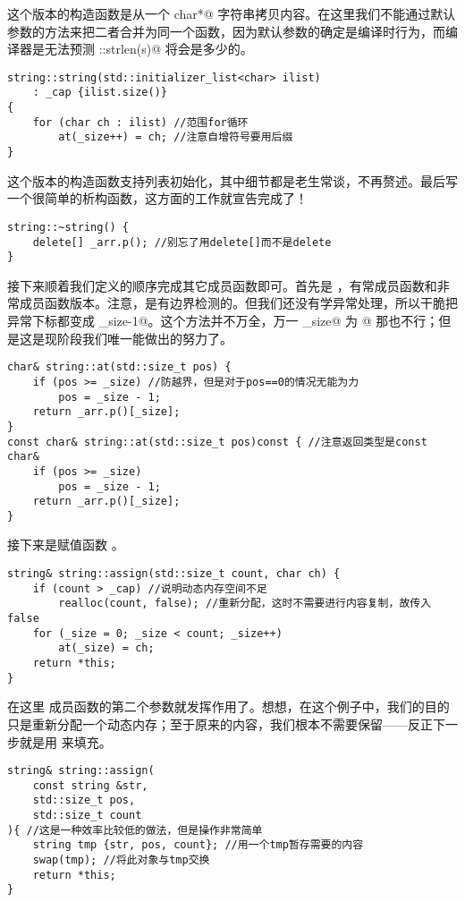 这个版本的构造函数是从一个 \lstinline@const char*@ 字符串拷贝内容。在这里我们不能通过默认参数的方法来把二者合并为同一个函数，因为默认参数的确定是编译时行为，而编译器是无法预测 \lstinline@std::strlen(s)@ 将会是多少的。
\begin{lstlisting}
string::string(std::initializer_list<char> ilist)
    : _cap {ilist.size()}
{
    for (char ch : ilist) //范围for循环
        at(_size++) = ch; //注意自增符号要用后缀
}
\end{lstlisting}
这个版本的构造函数支持列表初始化，其中细节都是老生常谈，不再赘述。最后写一个很简单的析构函数，这方面的工作就宣告完成了！
\begin{lstlisting}
string::~string() {
    delete[] _arr.p(); //别忘了用delete[]而不是delete
}
\end{lstlisting}\par
接下来顺着我们定义的顺序完成其它成员函数即可。首先是 \lstinline@at@，有常成员函数和非常成员函数版本。注意，\lstinline@at@ 是有边界检测的。但我们还没有学异常处理，所以干脆把异常下标都变成 \lstinline@_size-1@。这个方法并不万全，万一 \lstinline@_size@ 为 @ 那也不行；但是这是现阶段我们唯一能做出的努力了。\par
\begin{lstlisting}
char& string::at(std::size_t pos) {
    if (pos >= _size) //防越界，但是对于pos==0的情况无能为力
        pos = _size - 1;
    return _arr.p()[_size];
}
const char& string::at(std::size_t pos)const { //注意返回类型是const char&
    if (pos >= _size)
        pos = _size - 1;
    return _arr.p()[_size];
}
\end{lstlisting}\par
接下来是赋值函数 \lstinline@assign@。
\begin{lstlisting}
string& string::assign(std::size_t count, char ch) {
    if (count > _cap) //说明动态内存空间不足
        realloc(count, false); //重新分配，这时不需要进行内容复制，故传入false
    for (_size = 0; _size < count; _size++)
        at(_size) = ch;
    return *this;
}
\end{lstlisting}
在这里 \lstinline@realloc@ 成员函数的第二个参数就发挥作用了。想想，在这个例子中，我们的目的只是重新分配一个动态内存；至于原来的内容，我们根本不需要保留——反正下一步就是用 \lstinline@char@ 来填充。
\begin{lstlisting}
string& string::assign(
    const string &str,
    std::size_t pos,
    std::size_t count
){ //这是一种效率比较低的做法，但是操作非常简单
    string tmp {str, pos, count}; //用一个tmp暂存需要的内容
    swap(tmp); //将此对象与tmp交换
    return *this;
}
\end{lstlisting}
